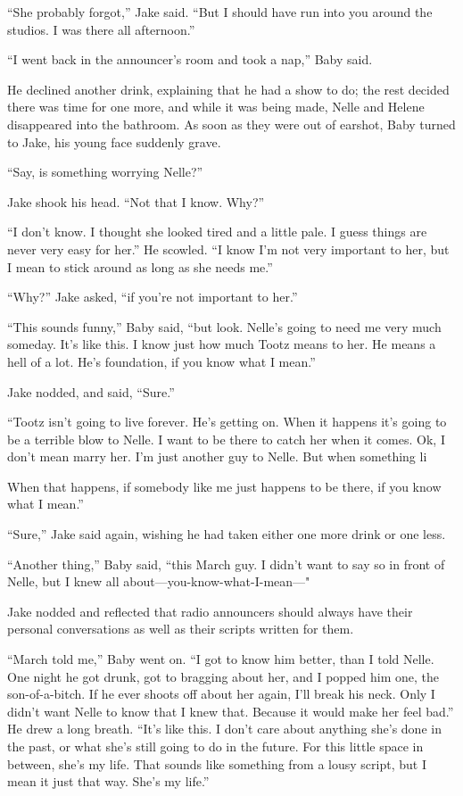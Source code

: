 \documentclass{novel}
\begin{document}
“She probably forgot,” Jake said. “But I should have run into you around the studios. I was there all afternoon.”

“I went back in the announcer’s room and took a nap,” Baby said.

He declined another drink, explaining that he had a show to do; the rest decided there was time for one more, and while it was being made, Nelle and Helene disappeared into the bathroom. As soon as they were out of earshot, Baby turned to Jake, his young face suddenly grave.

“Say, is something worrying Nelle?”

Jake shook his head. “Not that I know. Why?”

“I don’t know. I thought she looked tired and a little pale. I guess things are never very easy for her.” He scowled. “I know I’m not very important to her, but I mean to stick around as long as she needs me.”

“Why?” Jake asked, “if you’re not important to her.”

“This sounds funny,” Baby said, “but look. Nelle’s going to need me very much someday. It’s like this. I know just how much Tootz means to her. He means a hell of a lot. He’s foundation, if you know what I mean.”

Jake nodded, and said, “Sure.”

“Tootz isn’t going to live forever. He’s getting on. When it happens it’s going to be a terrible blow to Nelle. I want to be there to catch her when it comes. Ok, I don’t mean marry her. I’m just another guy to Nelle. But when something li

When that happens, if somebody like me just happens to be there, if you know what I mean.”

“Sure,” Jake said again, wishing he had taken either one more drink or one less.

“Another thing,” Baby said, “this March guy. I didn’t want to say so in front of Nelle, but I knew all about—you-know-what-I-mean—"

Jake nodded and reflected that radio announcers should always have their personal conversations as well as their scripts written for them.

“March told me,” Baby went on. “I got to know him better, than I told Nelle. One night he got drunk, got to bragging about her, and I popped him one, the son-of-a-bitch. If he ever shoots off about her again, I'll break his neck. Only I didn’t want Nelle to know that I knew that. Because it would make her feel bad.” He drew a long breath. “It’s like this. I don’t care about anything she’s done in the past, or what she’s still going to do in the future. For this little space in between, she’s my life. That sounds like something from a lousy script, but I mean it just that way. She’s my life.”
\end{document}
